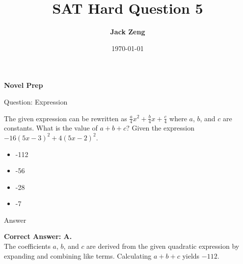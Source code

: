 \documentclass{beamer}
\title[SAT Hard Question]{\textbf{SAT Hard Question 5}}
\author{\textbf{Jack Zeng}}
\institute{\textcolor{white}{\textbf{Novel Prep}}}
\date{\today}
\begin{document}
\begin{frame}
    \titlepage
    \vfill
    \begin{flushright}
        \textcolor{purpleblue}{\Huge \textbf{Novel Prep}}
    \end{flushright}
\end{frame}


\begin{frame}
\end{frame}


\begin{frame}{Question: Expression}
    
The given expression can be rewritten as \(\frac{a}{4}x^2 + \frac{b}{4}x + \frac{c}{4}\) where \(a\), \(b\), and \(c\) are constants. What is the value of \(a+b+c\)? Given the expression \(-16(5x-3)^2 + 4(5x-2)^2\).
\begin{itemize}
    \item[A] -112
    \item[B] -56
    \item[C] -28
    \item[D] -7
\end{itemize}
\end{frame}

\begin{frame}{Answer}
    

\textbf{Correct Answer: A.} \\
The coefficients \(a\), \(b\), and \(c\) are derived from the given quadratic expression by expanding and combining like terms. Calculating \(a+b+c\) yields \(-112\).
\end{frame}
\end{document}
